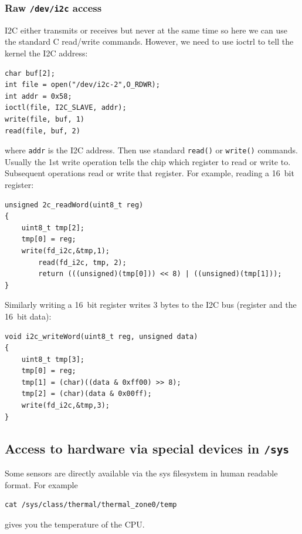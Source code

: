 \documentclass[12pt]{report}
\begin{document}
\subsubsection{Raw \texttt{/dev/i2c} access}
I2C either transmits or receives but never at the same time so here we
can use the standard C read/write commands. However, we need to use ioctrl to tell
the kernel the I2C address:
\begin{verbatim}
char buf[2];
int file = open("/dev/i2c-2",O_RDWR);
int addr = 0x58;
ioctl(file, I2C_SLAVE, addr);
write(file, buf, 1)
read(file, buf, 2)
\end{verbatim}
where \texttt{addr} is the I2C address. Then use standard \texttt{read()}
or \texttt{write()} commands. Usually the 1st write operation tells the chip
which register to read or write to. Subsequent operations read
or write that register. For example, reading a 16~bit register:
\begin{verbatim}
unsigned 2c_readWord(uint8_t reg)
{
	uint8_t tmp[2];
	tmp[0] = reg;
	write(fd_i2c,&tmp,1);
        read(fd_i2c, tmp, 2);
        return (((unsigned)(tmp[0])) << 8) | ((unsigned)(tmp[1]));
}
\end{verbatim}
Similarly writing a 16~bit register writes 3 bytes to the I2C bus (register and the 16~bit data):
\begin{verbatim}
void i2c_writeWord(uint8_t reg, unsigned data)
{
	uint8_t tmp[3];
	tmp[0] = reg;
	tmp[1] = (char)((data & 0xff00) >> 8);
	tmp[2] = (char)(data & 0x00ff);
	write(fd_i2c,&tmp,3);
}
\end{verbatim}


\subsection{Access to hardware via special devices in \texttt{/sys}}
Some sensors are directly available via the sys filesystem in human readable format.
For example
\begin{verbatim}
cat /sys/class/thermal/thermal_zone0/temp
\end{verbatim}
gives you the temperature of the CPU.
\end{document}
